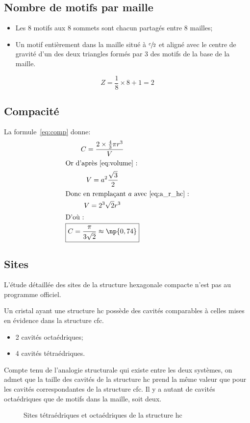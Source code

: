 \subsection{Nombre de motifs par maille}
\begin{itemize}
    \item Les 8 motifs aux 8 sommets sont chacun partagés entre
        8 mailles;
    \item Un motif entièrement dans la maille situé à
        $\sfrac{c}{2}$ et aligné avec le centre de gravité d'un
        des deux triangles formés par 3 des motifs de la base de
        la maille.
\end{itemize}
\begin{equation}
    Z = \frac{1}{8} \times 8 + 1 = 2
\end{equation}

\subsection{Compacité}
La formule~\ref{eq:comp} donne:
\begin{gather}
    C = \frac{2 \times \frac{4}{3}\pi r^3}{V}\\
    \intertext{Or d'après~\ref{eq:volume} :}
    V=a^2 \frac{\sqrt{3}}{2}\\
    \intertext{Donc en remplaçant $a$ avec~\ref{eq;a_r_hc} :}
    V=2^3\sqrt{2}r^3 \label{eq:V_hc}\\
    \intertext{D'où :}
    \boxed{C = \frac{\pi}{3\sqrt{2}} \approx \np{0,74}}
    \label{eq:comp_hc}
\end{gather}

\subsection{Sites}
\begin{rem}
    L'étude détaillée des sites de la structure hexagonale
    compacte n'est pas au programme officiel.
\end{rem}
Un cristal ayant une structure hc possède des cavités comparables
à celles mises en évidence dans la structure cfc.
\begin{itemize}
    \item 2 cavités octaédriques;
    \item 4 cavités tétraédriques.
\end{itemize}
Compte tenu de l’analogie structurale qui existe entre les deux
systèmes, on admet que la taille des cavités de la structure
hc prend la même valeur que pour les cavités correspondantes
de la structure cfc. Il y a autant de cavités octaédriques que
de motifs dans la maille, soit deux.
\begin{figure}
    \centering
    
    \caption{Sites tétraédriques et octaédriques
        de la structure hc}
\end{figure}


